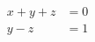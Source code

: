 \documentclass{article}
\begin{document}
\begin{align}
  x + y + z &= 0 \tag{$\star$} \\
  y - z &= 1 \tag{$\star\star$}
\end{align}
\end{document}
